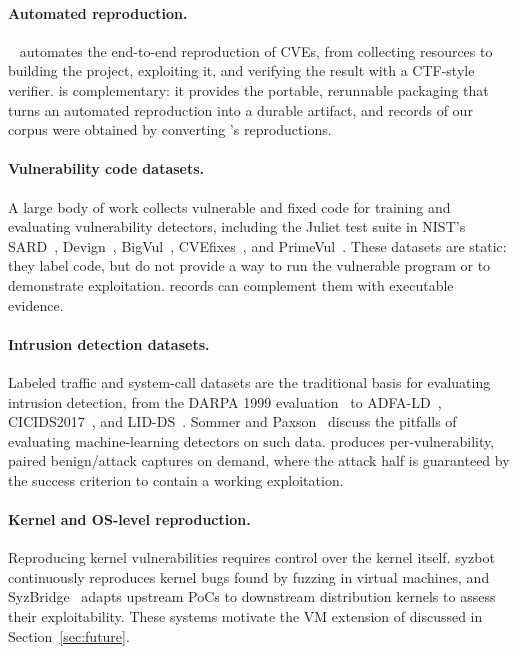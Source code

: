 \paragraph{Automated reproduction.}
\genie~\cite{ullah2026cvegenie} automates the end-to-end reproduction of
CVEs, from collecting resources to building the project, exploiting it, and
verifying the result with a CTF-style verifier. \cvex is complementary: it
provides the portable, rerunnable packaging that turns an automated
reproduction into a durable artifact, and \NumGenieFunctional records of our
corpus were obtained by converting \genie's reproductions.

\paragraph{Vulnerability code datasets.}
A large body of work collects vulnerable and fixed code for training and
evaluating vulnerability detectors, including the Juliet test suite in
NIST's SARD~\cite{sard}, Devign~\cite{zhou2019devign}, BigVul~\cite{fan2020bigvul},
CVEfixes~\cite{bhandari2021cvefixes}, and PrimeVul~\cite{ding2025primevul}.
These datasets are static: they label code, but do not provide a way to run
the vulnerable program or to demonstrate exploitation. \cvex records can
complement them with executable evidence.

\paragraph{Intrusion detection datasets.}
Labeled traffic and system-call datasets are the traditional basis for
evaluating intrusion detection, from the DARPA 1999
evaluation~\cite{lippmann2000darpa} to ADFA-LD~\cite{creech2013adfa},
CICIDS2017~\cite{sharafaldin2018cicids}, and LID-DS~\cite{grimmer2023liddsr}.
Sommer and Paxson~\cite{sommer2010outside} discuss the pitfalls of
evaluating machine-learning detectors on such data. \cvex produces
per-vulnerability, paired benign/attack captures on demand, where the attack
half is guaranteed by the success criterion to contain a working
exploitation.

\paragraph{Kernel and OS-level reproduction.}
Reproducing kernel vulnerabilities requires control over the kernel itself.
syzbot~\cite{syzbot} continuously reproduces kernel bugs found by fuzzing in
virtual machines, and SyzBridge~\cite{zou2024syzbridge} adapts upstream PoCs
to downstream distribution kernels to assess their exploitability. These
systems motivate the VM extension of \cvex discussed in
Section~\ref{sec:future}.
